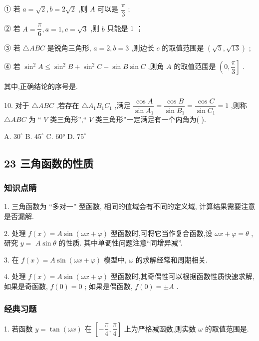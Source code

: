 ① 若 $a = \sqrt{2},b = 2\sqrt{2}$ ,则 $A$ 可以是 $\dfrac{\pi }{3}$ ;

② 若 $A = \dfrac{\pi }{6},a = 1,c = \sqrt{3}$ ,则 $b$ 只能是 1 ；

③ 若 $\bigtriangleup {ABC}$ 是锐角三角形, $a = 2,b = 3$ ,则边长 $c$ 的取值范围是 $\left( {\sqrt{5},\sqrt{13}}\right)$ ;

④ 若 ${\sin }^{2}A \leq  {\sin }^{2}B + {\sin }^{2}C - \sin B\sin C$ ,则角 $A$ 的取值范围是 $\left( {0,\dfrac{\pi }{3}}\right\rbrack$ .

其中,正确结论的序号是\blkda{}.

10. 对于 $\bigtriangleup {ABC}$ ,若存在 $\bigtriangleup {A}_{1}{B}_{1}{C}_{1}$ ,满足 $\dfrac{\cos A}{\sin {A}_{1}} = \dfrac{\cos B}{\sin {B}_{1}} = \dfrac{\cos C}{\sin {C}_{1}} = 1$ ,则称 $\bigtriangleup {ABC}$ 为 “ $V$ 类三角形”,“ $V$ 类三角形”一定满足有一个内角为(   ).

A. ${30}^{ \circ  }$ B. ${45}^{ \circ  }$ C. 60° D. ${75}^{ \circ  }$

\subsection*{23 三角函数的性质}

\subsubsection*{知识点睛}

1. 三角函数为 “多对一” 型函数, 相同的值域会有不同的定义域, 计算结果需要注意是否漏解.

2. 处理 $f\left( x\right)  = A\sin \left( {{\omega x} + \varphi }\right)$ 型函数时,可将它当作复合函数,设 ${\omega x} + \varphi  = \theta$ ,研究 $y =$  $A\sin \theta$ 的性质. 其中单调性问题注意“同增异减”.

3. 在 $f\left( x\right)  = A\sin \left( {{\omega x} + \varphi }\right)$ 模型中, $\omega$ 的求解经常和周期相关.

4. 处理 $f\left( x\right)  = A\sin \left( {{\omega x} + \varphi }\right)$ 型函数时,其奇偶性可以根据函数性质快速求解,如果是奇函数, $f\left( 0\right)  = 0$ ; 如果是偶函数, $f\left( 0\right)  =  \pm  A$ .

\subsubsection*{经典习题}

1. 若函数 $y = \tan \left( {\omega x}\right)$ 在 $\left\lbrack  {-\dfrac{\pi }{4},\dfrac{\pi }{4}}\right\rbrack$ 上为严格减函数,则实数 $\omega$ 的取值范围是\blkda{}.

